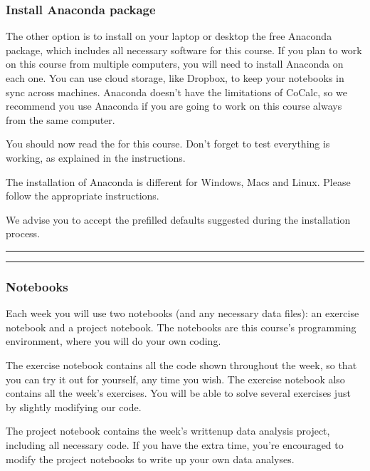 \documentclass[letterpaper,10pt,english]{sphinxmanual}
\begin{document}
\subsubsection{Install Anaconda package}
\label{\detokenize{content/session_01/Part_01_02:Install-Anaconda-package}}
The other option is to install on your laptop or desktop the free Anaconda package, which includes all necessary software for this course. If you plan to work on this course from multiple computers, you will need to install Anaconda on each one. You can use cloud storage, like Dropbox, to keep your notebooks in sync across machines. Anaconda doesn’t have the limitations of CoCalc, so we recommend you use Anaconda if you are going to work on this course always from the same computer.

You should now read the for this course. Don’t forget to test everything is working, as explained in the instructions.

The installation of Anaconda is different for Windows, Macs and Linux. Please follow the appropriate instructions.

We advise you to accept the pre\sphinxhyphen{}filled defaults suggested during the installation process.


\bigskip\hrule\bigskip



\bigskip\hrule\bigskip



\subsubsection{Notebooks}
\label{\detokenize{content/session_01/Part_01_02:Notebooks}}
Each week you will use two notebooks (and any necessary data files): an exercise notebook and a project notebook. The notebooks are this course’s programming environment, where you will do your own coding.

The exercise notebook contains all the code shown throughout the week, so that you can try it out for yourself, any time you wish. The exercise notebook also contains all the week’s exercises. You will be able to solve several exercises just by slightly modifying our code.

The project notebook contains the week’s written\sphinxhyphen{}up data analysis project, including all necessary code. If you have the extra time, you’re encouraged to modify the project notebooks to write up your own data analyses.
\end{document}
